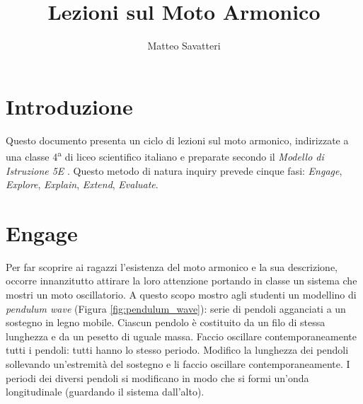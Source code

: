 \documentclass{article}
\title{Lezioni sul Moto Armonico}
\author{Matteo Savatteri}
\begin{document}
\maketitle

\tableofcontents

\section{Introduzione}
Questo documento presenta un ciclo di lezioni sul moto
armonico, indirizzate a una classe 4\textsuperscript{a}
di liceo scientifico italiano e preparate secondo il
\emph{Modello di Istruzione 5E} \cite{bybee2009bscs}.
Questo metodo di natura inquiry prevede cinque fasi:
\emph{Engage}, \emph{Explore},
\emph{Explain}, \emph{Extend}, \emph{Evaluate}.

\section{Engage}
Per far scoprire ai ragazzi l'esistenza del moto armonico e
la sua descrizione, occorre innanzitutto attirare la loro
attenzione portando in classe un sistema che mostri un moto
oscillatorio. A questo scopo mostro agli studenti un modellino di
\emph{pendulum wave} (Figura \ref{fig:pendulum_wave}):
serie di pendoli agganciati a un sostegno in legno mobile.
Ciascun pendolo è costituito da un filo di stessa lunghezza
e da un pesetto di uguale massa. 
Faccio oscillare contemporaneamente tutti i pendoli:
tutti hanno lo stesso periodo. 
Modifico la lunghezza dei pendoli sollevando un'estremità del
sostegno e li faccio oscillare contemporaneamente. I periodi
dei diversi pendoli si modificano in modo che si formi un'onda
longitudinale (guardando il sistema dall'alto).
\end{document}
